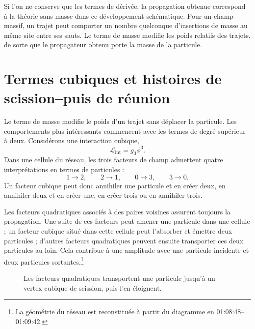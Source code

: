 Si l’on ne conserve que les termes de dérivée, la propagation obtenue correspond à la théorie sans masse dans ce développement schématique. Pour un champ massif, un trajet peut comporter un nombre quelconque d’insertions de masse au même site entre ses sauts. Le terme de masse modifie les poids relatifs des trajets, de sorte que le propagateur obtenu porte la masse de la particule.

\section{Termes cubiques et histoires de scission--puis de réunion}

Le terme de masse modifie le poids d’un trajet sans déplacer la particule. Les comportements plus intéressants commencent avec les termes de degré supérieur à deux. Considérons une interaction cubique,
\begin{equation}
\mathcal{L}_{\mathrm{int}}=g_3\phi^3.
\end{equation}
Dans une cellule du réseau, les trois facteurs de champ admettent quatre interprétations en termes de particules :
\begin{equation}
1\longrightarrow 2,
\qquad
2\longrightarrow 1,
\qquad
0\longrightarrow 3,
\qquad
3\longrightarrow 0.
\end{equation}
Un facteur cubique peut donc annihiler une particule et en créer deux, en annihiler deux et en créer une, en créer trois ou en annihiler trois.

Les facteurs quadratiques associés à des paires voisines assurent toujours la propagation. Une suite de ces facteurs peut amener une particule dans une cellule ; un facteur cubique situé dans cette cellule peut l’absorber et émettre deux particules ; d’autres facteurs quadratiques peuvent ensuite transporter ces deux particules au loin. Cela contribue à une amplitude avec une particule incidente et deux particules sortantes.\footnote{La géométrie du réseau est reconstituée à partir du diagramme en 01:08:48--01:09:42.}

\begin{figure}[htbp]
\centering
{}
\caption{Les facteurs quadratiques transportent une particule jusqu’à un vertex cubique de scission, puis l’en éloignent.}
\end{figure}

